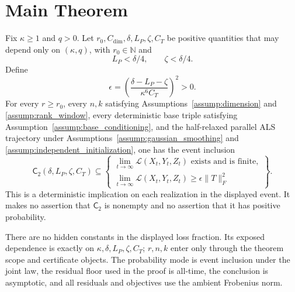\section{Main Theorem}\label{sec:main}

\begin{theorem}\label{thm:main}
Fix $\kappa\geq1$ and $q>0$.  Let
$r_0,C_{\mathrm{dim}},\delta,L_P,\zeta,C_T$ be positive quantities that
may depend only on $(\kappa,q)$, with $r_0\in\mathbb N$ and
\[
L_P<\delta/4,
\qquad
\zeta<\delta/4.
\]
Define
\[
\epsilon=
\left(\frac{\delta-L_P-\zeta}{\kappa^6C_T}\right)^2>0.
\]
For every $r\geq r_0$, every $n,k$ satisfying
Assumptions~\ref{assump:dimension} and \ref{assump:rank_window}, every
deterministic base triple satisfying
Assumption~\ref{assump:base_conditioning}, and the half-relaxed parallel ALS
trajectory under Assumptions~\ref{assump:gaussian_smoothing} and
\ref{assump:independent_initialization}, one has the event inclusion
\[
\mathsf C_2(\delta,L_P,\zeta,C_T)
\subseteq
\left\{
\begin{array}{l}
\displaystyle \lim_{t\to\infty}\mathcal L(X_t,Y_t,Z_t)
\text{ exists and is finite},\\[2mm]
\displaystyle \lim_{t\to\infty}\mathcal L(X_t,Y_t,Z_t)
\geq\epsilon\|T\|_F^2
\end{array}
\right\}.
\]
This is a deterministic implication on each realization in the displayed
event.  It makes no assertion that $\mathsf C_2$ is nonempty and no assertion
that it has positive probability.

There are no hidden constants in the displayed loss fraction.  Its exposed
dependence is exactly on $\kappa,\delta,L_P,\zeta,C_T$; $r,n,k$ enter only
through the theorem scope and certificate objects.  The probability mode is
event inclusion under the joint law, the residual floor used in the proof is
all-time, the conclusion is asymptotic, and all residuals and objectives use
the ambient Frobenius norm.


\end{theorem}
